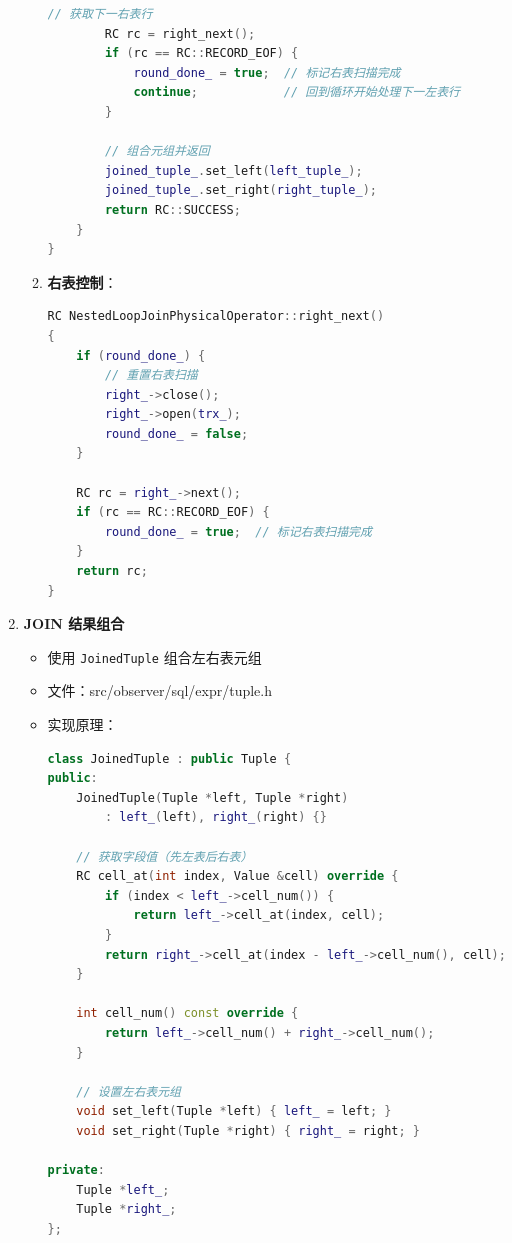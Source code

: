 \documentclass[a4paper, 12pt]{article}
\begin{document}
\begin{enumerate}
\begin{enumerate}
\begin{lstlisting}[language=C++]
        // 获取下一右表行
        RC rc = right_next();
        if (rc == RC::RECORD_EOF) {
            round_done_ = true;  // 标记右表扫描完成
            continue;            // 回到循环开始处理下一左表行
        }
        
        // 组合元组并返回
        joined_tuple_.set_left(left_tuple_);
        joined_tuple_.set_right(right_tuple_);
        return RC::SUCCESS;
    }
}
        \end{lstlisting}
        
        \item \textbf{右表控制}：
        
\begin{lstlisting}[language=C++]
RC NestedLoopJoinPhysicalOperator::right_next()
{
    if (round_done_) {
        // 重置右表扫描
        right_->close();
        right_->open(trx_);
        round_done_ = false;
    }
    
    RC rc = right_->next();
    if (rc == RC::RECORD_EOF) {
        round_done_ = true;  // 标记右表扫描完成
    }
    return rc;
}
        \end{lstlisting}
    \end{enumerate}
    
    \item \textbf{JOIN 结果组合}
    
\begin{itemize}
        \item 使用 \texttt{JoinedTuple} 组合左右表元组
        \item 文件：src/observer/sql/expr/tuple.h
        \item 实现原理：
        \begin{lstlisting}[language=C++]
class JoinedTuple : public Tuple {
public:
    JoinedTuple(Tuple *left, Tuple *right) 
        : left_(left), right_(right) {}
    
    // 获取字段值（先左表后右表）
    RC cell_at(int index, Value &cell) override {
        if (index < left_->cell_num()) {
            return left_->cell_at(index, cell);
        }
        return right_->cell_at(index - left_->cell_num(), cell);
    }
    
    int cell_num() const override {
        return left_->cell_num() + right_->cell_num();
    }
    
    // 设置左右表元组
    void set_left(Tuple *left) { left_ = left; }
    void set_right(Tuple *right) { right_ = right; }
    
private:
    Tuple *left_;
    Tuple *right_;
};
        \end{lstlisting}
    \end{itemize}
    

\end{enumerate}
\end{document}
